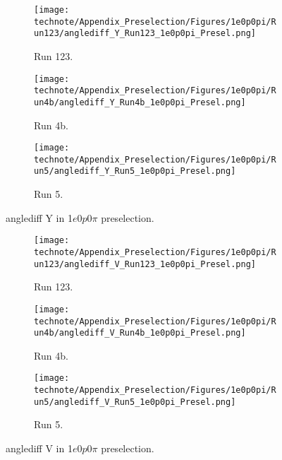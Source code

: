 \begin{figure}[H]
    \centering
    \begin{subfigure}[t]{0.32\linewidth}
        \texttt{[image: technote/Appendix\_Preselection/Figures/1e0p0pi/Run123/anglediff\_Y\_Run123\_1e0p0pi\_Presel.png]}
        \caption{Run 123.}
    \end{subfigure}%
    \hspace{0.2cm}%
    \begin{subfigure}[t]{0.32\linewidth}
        \texttt{[image: technote/Appendix\_Preselection/Figures/1e0p0pi/Run4b/anglediff\_Y\_Run4b\_1e0p0pi\_Presel.png]}
        \caption{Run 4b.}
    \end{subfigure}%
    \hspace{0.2cm}%
    \begin{subfigure}[t]{0.32\linewidth}
        \texttt{[image: technote/Appendix\_Preselection/Figures/1e0p0pi/Run5/anglediff\_Y\_Run5\_1e0p0pi\_Presel.png]}
        \caption{Run 5.}
    \end{subfigure}
    \caption{anglediff Y in 1$e$0$p$0$\pi$ preselection.}
\end{figure}

\begin{figure}[H]
    \centering
    \begin{subfigure}[t]{0.32\linewidth}
        \texttt{[image: technote/Appendix\_Preselection/Figures/1e0p0pi/Run123/anglediff\_V\_Run123\_1e0p0pi\_Presel.png]}
        \caption{Run 123.}
    \end{subfigure}%
    \hspace{0.2cm}%
    \begin{subfigure}[t]{0.32\linewidth}
        \texttt{[image: technote/Appendix\_Preselection/Figures/1e0p0pi/Run4b/anglediff\_V\_Run4b\_1e0p0pi\_Presel.png]}
        \caption{Run 4b.}
    \end{subfigure}%
    \hspace{0.2cm}%
    \begin{subfigure}[t]{0.32\linewidth}
        \texttt{[image: technote/Appendix\_Preselection/Figures/1e0p0pi/Run5/anglediff\_V\_Run5\_1e0p0pi\_Presel.png]}
        \caption{Run 5.}
    \end{subfigure}
    \caption{anglediff V in 1$e$0$p$0$\pi$ preselection.}
\end{figure}


